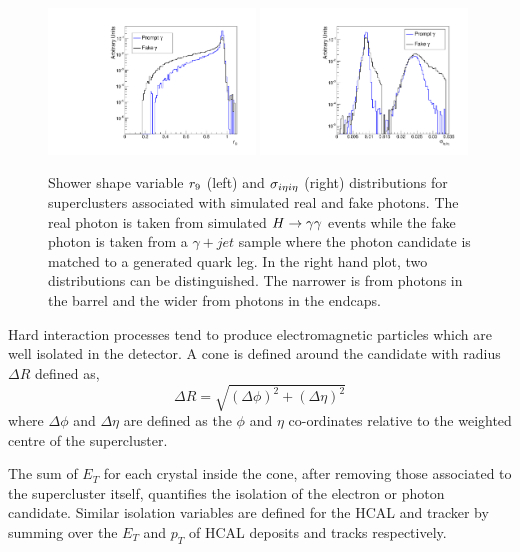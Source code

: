 \begin{figure}[hbt!]
\begin{center}
	\includegraphics[width=0.49\textwidth]{detector/r9eg.pdf}
	\includegraphics[width=0.49\textwidth]{detector/sieieeg.pdf}
	\caption{Shower shape variable $r_{9}$ (left) and $\sigma_{i\eta i\eta}$ (right) distributions 
	for superclusters associated with simulated real and fake photons. The real photon is taken
	from simulated $H\rightarrow\gamma\gamma$ events while the fake photon is taken from a $\gamma+jet$ sample
	where the photon candidate is matched to a generated quark leg. In the right hand plot,
	two distributions can be distinguished. The narrower is from photons in the barrel and
	the wider from photons in the endcaps. }
	\label{fig:showershape}
\end{center}
\end{figure}

Hard interaction processes tend to produce electromagnetic particles which are well
isolated in the detector. A cone is defined around the candidate with radius $\Delta R$ defined as,
\begin{equation}
\Delta R = \sqrt{(\Delta\phi)^{2}+(\Delta\eta)^{2}}
\end{equation}
where $\Delta\phi$ and $\Delta\eta$ are defined as the $\phi$ and $\eta$ co-ordinates relative to the 
weighted centre of the supercluster.

The sum of $E_{T}$ for each crystal inside the cone, after removing those associated 
to the supercluster itself, quantifies the isolation of the electron or photon candidate.
Similar isolation variables are defined for the HCAL and tracker by
summing over the $E_{T}$ and $p_{T}$ of HCAL deposits and tracks respectively.

